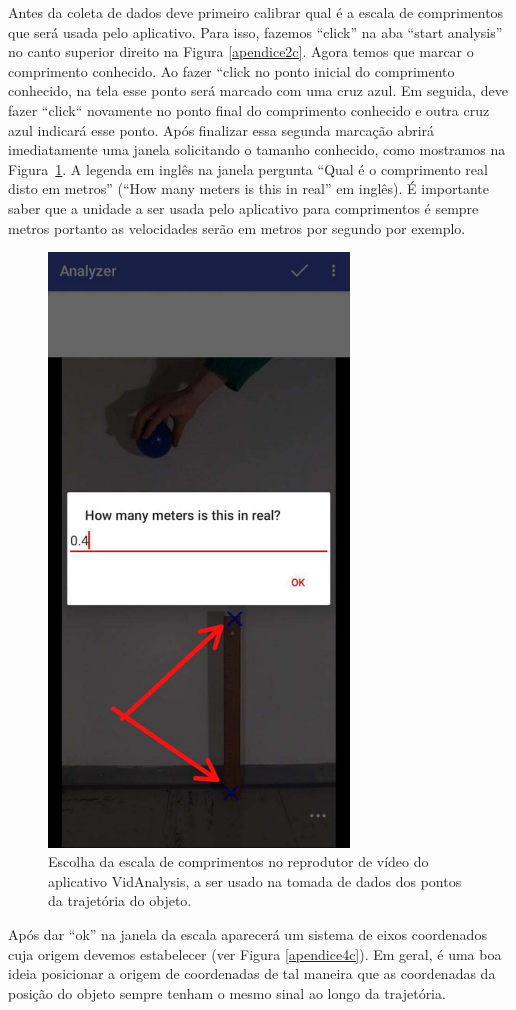 Antes da coleta de dados deve primeiro calibrar qual é a escala de comprimentos que será usada pelo aplicativo. Para isso, fazemos ``click'' na aba ``start analysis''  no canto superior direito na Figura \ref{apendice2c}. Agora temos que marcar o comprimento conhecido.
 Ao fazer ``click no ponto inicial do comprimento conhecido, na tela esse ponto será marcado com uma cruz azul. Em seguida, deve fazer “click“ novamente no ponto final do comprimento conhecido e outra cruz azul indicará esse ponto. Após finalizar essa segunda marcação abrirá imediatamente uma janela solicitando o tamanho conhecido, como mostramos na Figura~\ref{apendice3c}. A legenda em inglês na janela pergunta ``Qual é o comprimento real disto em metros'' (``How many meters is this in real'' em inglês). É importante saber que a unidade a ser usada pelo aplicativo para comprimentos é sempre metros portanto as velocidades serão em metros por segundo por exemplo.
 
\begin{figure}[h!]
\center
\includegraphics[width=8cm]{Figuras_exp3/imagenapendicec3.pdf}
\caption{\label{apendice3c} Escolha da escala de comprimentos no reprodutor de vídeo do aplicativo VidAnalysis, a ser usado na tomada de dados dos pontos da trajetória do objeto.}

\end{figure}
Após dar ``ok'' na janela da escala aparecerá um sistema de eixos coordenados cuja origem devemos estabelecer (ver Figura  \ref{apendice4c}). Em geral, é uma boa ideia posicionar a origem de coordenadas de tal maneira que as coordenadas da posição do objeto sempre tenham o mesmo sinal ao longo da trajetória.

